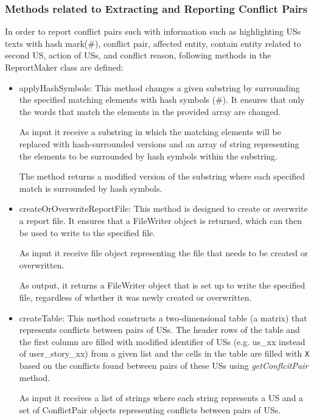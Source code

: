 \subsubsection*{Methods related to Extracting and Reporting Conflict Pairs}
In order to report conflict pairs such with information such as highlighting USs texts with hash mark(\#), conflict pair, affected entity, contain entity related to second US, action of USs, and conflict reason, following methods in the ReprortMaker class are defined:

\begin{itemize}
	\item applyHashSymbols: This method changes a given substring by surrounding the specified matching elements with hash symbols (\#). It ensures that only the words that match the elements in the provided array are changed. 
	
	As input it receive a substring in which the matching elements will be replaced with hash-surrounded versions and an array of string representing the elements to be surrounded by hash symbols within the substring.
	
	The method returns a modified version of the substring where each specified match is surrounded by hash symbols.
	
	\item createOrOverwriteReportFile: This method is designed to create or overwrite a report file. It ensures that a FileWriter object is returned, which can then be used to write to the specified file.
	
	As input it receive file object representing the file that needs to be created or overwritten.
	
	As output, it returns a FileWriter object that is set up to write the specified file, regardless of whether it was newly created or overwritten.
	
	\item createTable: This method constructs a two-dimensional table (a matrix) that represents conflicts between pairs of USs. The header rows of the table and the first column are filled with modified identifier of USs (e.g. us\_xx instead of user\_story\_xx) from a given list and the cells in the table are filled with \texttt{X} based on the conflicts found between pairs of these USs using \textit{getConflcitPair} method.
	
	As input it receives a list of strings where each string represents a US and a set of ConflictPair objects representing conflicts between pairs of USs.
	

\end{itemize}
